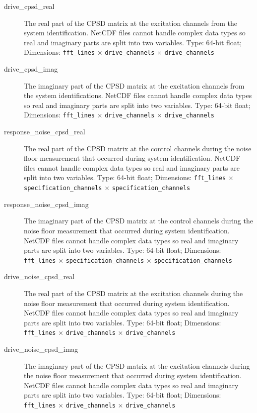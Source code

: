 \documentclass[pdf,12pt,report]{SANDreport}
\newcommand{\inlineCode}{\lstinline[basicstyle=\bfseries\ttfamily]}
\begin{document}
\begin{description}
        \item[drive\_cpsd\_real] The real part of the \ac{CPSD} matrix at the excitation channels from the system identification.  NetCDF files cannot handle complex data types so real and imaginary parts are split into two variables.  Type: 64-bit float; Dimensions: \inlineCode{fft_lines} $\times$ \inlineCode{drive_channels} $\times$ \inlineCode{drive_channels}
        
        \item[drive\_cpsd\_imag] The imaginary part of the \ac{CPSD} matrix at the excitation channels from the system identifications.  NetCDF files cannot handle complex data types so real and imaginary parts are split into two variables.  Type: 64-bit float; Dimensions: \inlineCode{fft_lines} $\times$ \inlineCode{drive_channels} $\times$ \inlineCode{drive_channels}
        
        \item[response\_noise\_cpsd\_real] The real part of the \ac{CPSD} matrix at the control channels during the noise floor measurement that occurred during system identification.  NetCDF files cannot handle complex data types so real and imaginary parts are split into two variables.  Type: 64-bit float; Dimensions: \inlineCode{fft_lines} $\times$ \inlineCode{specification_channels} $\times$ \inlineCode{specification_channels}
        
        \item[response\_noise\_cpsd\_imag] The imaginary part of the \ac{CPSD} matrix at the control channels during the noise floor measurement that occurred during system identification.  NetCDF files cannot handle complex data types so real and imaginary parts are split into two variables.  Type: 64-bit float; Dimensions: \inlineCode{fft_lines} $\times$ \inlineCode{specification_channels} $\times$ \inlineCode{specification_channels}
        
        \item[drive\_noise\_cpsd\_real] The real part of the \ac{CPSD} matrix at the excitation channels during the noise floor measurement that occurred during system identification.  NetCDF files cannot handle complex data types so real and imaginary parts are split into two variables.  Type: 64-bit float; Dimensions: \inlineCode{fft_lines} $\times$ \inlineCode{drive_channels} $\times$ \inlineCode{drive_channels}
        
        \item[drive\_noise\_cpsd\_imag] The imaginary part of the \ac{CPSD} matrix at the excitation channels during the noise floor measurement that occurred during system identification.  NetCDF files cannot handle complex data types so real and imaginary parts are split into two variables.  Type: 64-bit float; Dimensions: \inlineCode{fft_lines} $\times$ \inlineCode{drive_channels} $\times$ \inlineCode{drive_channels}
        

\end{description}
\end{document}
